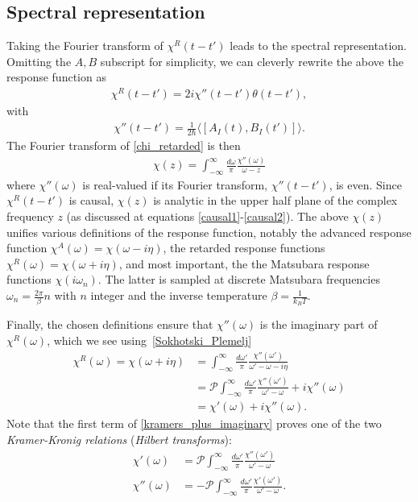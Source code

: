 \documentclass[notitlepage,11pt,nofootinbib]{revtex4-1}
\begin{document}
\subsection{Spectral representation}
Taking the Fourier transform of $\chi^R(t-t')$ leads to the spectral representation.
Omitting the $A,B$ subscript for simplicity, we can cleverly rewrite the above the response function as
\begin{align}
\chi^{R}(t-t') = 2i\chi''(t-t')\theta(t-t'),
\label{chi_retarded}
\end{align}
with
\begin{align}
\chi''(t-t') = \frac{1}{2\hbar}\langle [A_I(t),B_I(t')]\rangle.   
\end{align}
The Fourier transform of \eqref{chi_retarded} is then
\begin{align}
\boxed{
\chi(z) = \int_{-\infty}^{\infty} \frac{d\omega}{\pi} \frac{\chi''(\omega)}{\omega-z}
}
\label{spectral_representation}
\end{align}
where $\chi''(\omega)$ is real-valued if its Fourier transform, $\chi''(t-t')$, is even. Since $\chi^{R}(t-t')$ is causal, $\chi(z)$ is analytic in the upper half plane of the complex frequency $z$ (as discussed at equations \eqref{causal1}-\eqref{causal2}). The above $\chi(z)$ unifies various definitions of the response function, notably the advanced response function $\chi^{A}(\omega) = \chi(\omega-i\eta)$, the retarded response functions $\chi^{R}(\omega) = \chi(\omega+i\eta)$, and most important, the the Matsubara response functions $\chi(i\omega_n)$. The latter is
sampled at discrete Matsubara frequencies $\omega_{n} = \frac{2\pi}{\beta}n$ with $n$ integer and the inverse temperature $\beta=\frac{1}{k_B T}$.

Finally, the chosen definitions ensure that $\chi''(\omega)$ is the imaginary part of $\chi^R(\omega)$, which we see using~\eqref{Sokhotski_Plemelj}
\begin{align}
\chi^R(\omega) = \chi(\omega+i\eta) 
&= 
\int_{-\infty}^{\infty} \frac{d\omega'}{\pi} \frac{\chi''(\omega')}{\omega'-\omega-i\eta}
\\
&=
\mathcal P\int_{-\infty}^{\infty} \frac{d\omega'}{\pi} \frac{\chi''(\omega')}{\omega'-\omega}
+i\chi''(\omega)
\label{kramers_plus_imaginary}
\\
&=\chi'(\omega)+i\chi''(\omega).
\end{align}
Note that the first term of \eqref{kramers_plus_imaginary} proves one of the two \emph{Kramer-Kronig relations} (\emph{Hilbert transforms}):
\begin{align}
\chi'(\omega) &= \mathcal P\int_{-\infty}^{\infty} \frac{d\omega'}{\pi} \frac{\chi''(\omega')}{\omega'-\omega}
\\
\chi''(\omega) &= -\mathcal P\int_{-\infty}^{\infty} \frac{d\omega'}{\pi} \frac{\chi'(\omega')}{\omega'-\omega}.
\end{align}
\end{document}
